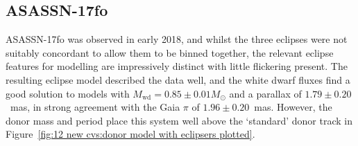 \newpage
\subsection{ASASSN-17fo}

ASASSN-17fo was observed in early 2018, and whilst the three eclipses were not suitably concordant to allow them to be binned together, the relevant eclipse features for modelling are impressively distinct with little flickering present. The resulting eclipse model described the data well, and the white dwarf fluxes find a good solution to models with $M_\mathrm{wd} = 0.85\pm0.01 M_\odot$ and a parallax of $1.79\pm0.20$~mas, in strong agreement with the Gaia $\pi$ of $1.96 \pm 0.20$~mas. However, the donor mass and period place this system well above the `standard' \citet{knigge11} donor track in Figure~\ref{fig:12 new cvs:donor model with eclipsers plotted}.


%     

